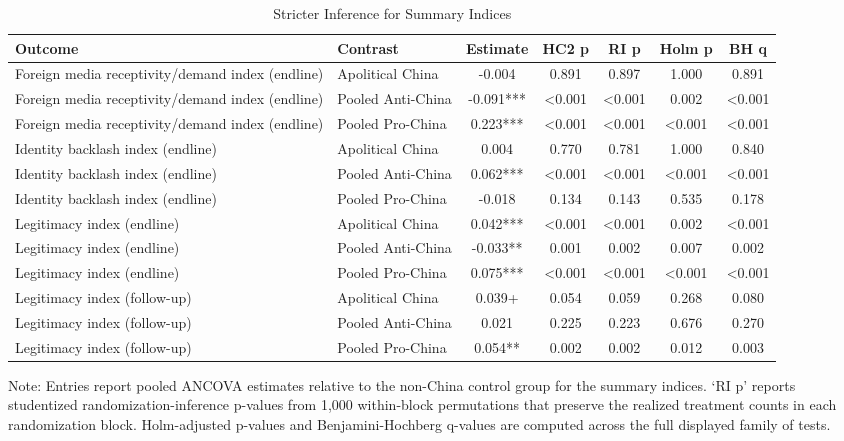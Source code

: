 \begin{table}[H]
\centering
\caption{Stricter Inference for Summary Indices}
\label{tab:summary_indices_strict}
\footnotesize
\begin{threeparttable}
\begin{tabular}{llccccc}
\toprule
Outcome & Contrast & Estimate & HC2 p & RI p & Holm p & BH q \\
\midrule
Foreign media receptivity/demand index (endline) & Apolitical China & -0.004 & 0.891 & 0.897 & 1.000 & 0.891 \\
Foreign media receptivity/demand index (endline) & Pooled Anti-China & -0.091*** & <0.001 & <0.001 & 0.002 & <0.001 \\
Foreign media receptivity/demand index (endline) & Pooled Pro-China & 0.223*** & <0.001 & <0.001 & <0.001 & <0.001 \\
Identity backlash index (endline) & Apolitical China & 0.004 & 0.770 & 0.781 & 1.000 & 0.840 \\
Identity backlash index (endline) & Pooled Anti-China & 0.062*** & <0.001 & <0.001 & <0.001 & <0.001 \\
Identity backlash index (endline) & Pooled Pro-China & -0.018 & 0.134 & 0.143 & 0.535 & 0.178 \\
Legitimacy index (endline) & Apolitical China & 0.042*** & <0.001 & <0.001 & 0.002 & <0.001 \\
Legitimacy index (endline) & Pooled Anti-China & -0.033** & 0.001 & 0.002 & 0.007 & 0.002 \\
Legitimacy index (endline) & Pooled Pro-China & 0.075*** & <0.001 & <0.001 & <0.001 & <0.001 \\
Legitimacy index (follow-up) & Apolitical China & 0.039+ & 0.054 & 0.059 & 0.268 & 0.080 \\
Legitimacy index (follow-up) & Pooled Anti-China & 0.021 & 0.225 & 0.223 & 0.676 & 0.270 \\
Legitimacy index (follow-up) & Pooled Pro-China & 0.054** & 0.002 & 0.002 & 0.012 & 0.003 \\
\bottomrule
\end{tabular}
\begin{tablenotes}[flushleft]
\footnotesize
\item Note: Entries report pooled ANCOVA estimates relative to the non-China control group for the summary indices. `RI p' reports studentized randomization-inference p-values from 1,000 within-block permutations that preserve the realized treatment counts in each randomization block. Holm-adjusted p-values and Benjamini-Hochberg q-values are computed across the full displayed family of tests.
\end{tablenotes}
\end{threeparttable}
\end{table}
